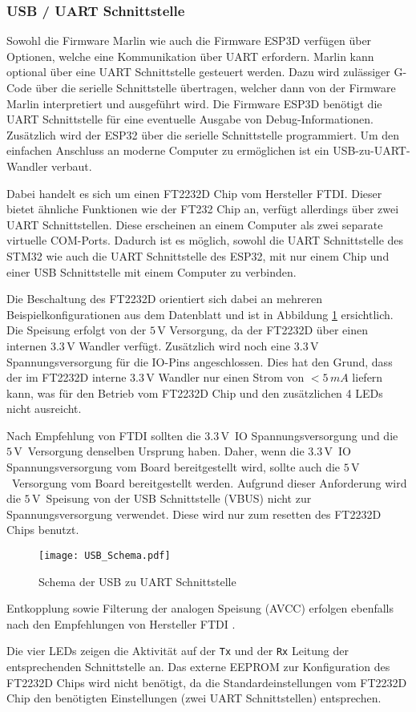 \subsubsection{USB / UART Schnittstelle}
\label{sec:SchemaUSBInterface}

Sowohl die Firmware Marlin wie auch die Firmware ESP3D verfügen über Optionen, welche eine Kommunikation über UART erfordern. Marlin kann optional über eine UART Schnittstelle gesteuert werden. Dazu wird zulässiger G-Code über die serielle Schnittstelle übertragen, welcher dann von der Firmware Marlin interpretiert und ausgeführt wird. Die Firmware ESP3D benötigt die UART Schnittstelle für eine eventuelle Ausgabe von Debug-Informationen. Zusätzlich wird der ESP32 über die serielle Schnittstelle programmiert. Um den einfachen Anschluss an moderne Computer zu ermöglichen ist ein USB-zu-UART-Wandler verbaut.

Dabei handelt es sich um einen FT2232D Chip vom Hersteller FTDI. Dieser bietet ähnliche Funktionen wie der FT232 Chip an, verfügt allerdings über zwei UART Schnittstellen. Diese erscheinen an einem Computer als zwei separate virtuelle COM-Ports. Dadurch ist es möglich, sowohl die UART Schnittstelle des STM32 wie auch die UART Schnittstelle des ESP32, mit nur einem Chip und einer USB Schnittstelle mit einem Computer zu verbinden.

Die Beschaltung des FT2232D orientiert sich dabei an mehreren Beispielkonfigurationen aus dem Datenblatt und ist in Abbildung \ref{pic:Schema_USB} ersichtlich. Die Speisung erfolgt von der $5\,\si{\volt}$ Versorgung, da der FT2232D über einen internen $3.3\,\si{\volt}$ Wandler verfügt. Zusätzlich wird noch eine $3.3\,\si{\volt}$ Spannungsversorgung für die IO-Pins angeschlossen.
Dies hat den Grund, dass der im FT2232D interne $3.3\,\si{\volt}$ Wandler nur einen Strom von $<5\,\si{mA}$ liefern kann, was für den Betrieb vom FT2232D Chip und den zusätzlichen 4 LEDs nicht ausreicht.

Nach Empfehlung von FTDI sollten die $3.3\,\si{\volt}$\ IO Spannungsversorgung und die $5\,\si{\volt}$\ Versorgung denselben Ursprung haben.
Daher, wenn die $3.3\,\si{\volt}$\ IO Spannungsversorgung vom Board bereitgestellt wird, sollte auch die $5\,\si{\volt}$\ Versorgung vom Board bereitgestellt werden. Aufgrund dieser Anforderung wird die $5\,\si{\volt}$\ Speisung von der USB Schnittstelle (VBUS) nicht zur Spannungsversorgung verwendet.
Diese wird nur zum resetten des FT2232D Chips benutzt.

\begin{figure}[h]
	\centering
	\texttt{[image: USB\_Schema.pdf]}
	\caption{Schema der USB zu UART Schnittstelle}
	\label{pic:Schema_USB}
\end{figure}

Entkopplung sowie Filterung der analogen Speisung (AVCC) erfolgen ebenfalls nach den Empfehlungen von Hersteller FTDI \cite{FT2232D}.

Die vier LEDs zeigen die Aktivität auf der \texttt{Tx} und der \texttt{Rx} Leitung der entsprechenden Schnittstelle an. Das externe EEPROM zur Konfiguration des FT2232D Chips wird nicht benötigt, da die Standardeinstellungen vom FT2232D Chip den benötigten Einstellungen (zwei UART Schnittstellen) entsprechen.
